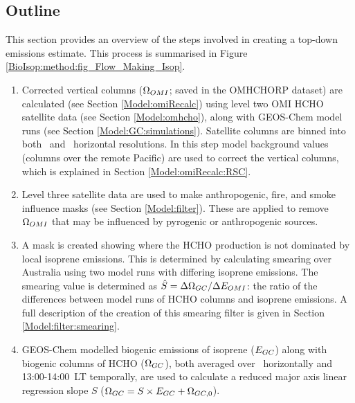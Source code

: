   
  \subsection{Outline}
    \label{BioIsop:method:outline}
    This section provides an overview of the steps involved in creating a top-down emissions estimate. %
    This process is summarised in Figure \ref{BioIsop:method:fig_Flow_Making_Isop}.
    \begin{enumerate}
      \item 
        Corrected vertical columns ($\Omega_{OMI}$; saved in the OMHCHORP dataset) are calculated (see Section \ref{Model:omiRecalc}) using level two OMI HCHO satellite data (see Section \ref{Model:omhcho}), along with GEOS-Chem model runs (see Section \ref{Model:GC:simulations}).
        Satellite columns are binned into both \highhr ~and \lowhr ~horizontal resolutions.
        In this step model background values (columns over the remote Pacific) are used to correct the vertical columns, which is explained in Section \ref{Model:omiRecalc:RSC}.
      \item 
        Level three satellite data are used to make anthropogenic, fire, and smoke influence masks (see Section \ref{Model:filter}).
        These are applied to remove $\Omega_{OMI}$ that may be influenced by pyrogenic or anthropogenic sources. 
      \item
        A mask is created showing where the HCHO production is not dominated by local isoprene emissions. 
        This is determined by calculating smearing over Australia using two model runs with differing isoprene emissions.
        The smearing value is determined as $\hat{S}=\Delta \Omega_{GC}/ \Delta E_{OMI}$: the ratio of the differences between model runs of HCHO columns and isoprene emissions.
        A full description of the creation of this smearing filter is given in Section \ref{Model:filter:smearing}.
      \item 
        GEOS-Chem modelled biogenic emissions of isoprene ($E_{GC}$) along with biogenic columns of HCHO ($\Omega_{GC}$), both averaged over \lowhr ~horizontally and 13:00-14:00~LT temporally, are used to calculate a reduced major axis linear regression slope $S$ ($\Omega_{GC}=S \times E_{GC} + \Omega_{GC,0}$).

\end{enumerate}
